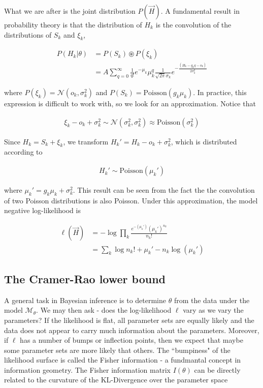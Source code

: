 \documentclass{ucetd}
\begin{document}
What we are after is the joint distribution $P(\vec{H})$. A fundamental result in probability theory is that the distribution of $H_{k}$ is the convolution of the distributions of $S_{k}$ and $\xi_{k}$,

\begin{align}
P(H_{k}|\theta) &= P(S_{k})\circledast P(\xi_{k})\\
&= A\sum_{q=0}^{\infty} \frac{1}{q!}e^{-\mu_{k}}\mu_{k}^{q}\frac{1}{\sqrt{2\pi}\sigma_{k}}e^{-\frac{(H_{k}-g_{k}q-o_{k})}{2\sigma_{k}^{2}}}
\end{align}

where $P(\xi_{k}) = \mathcal{N}(o_{k},\sigma_{k}^{2})$ and $P(S_{k}) = \mathrm{Poisson}(g_{k}\mu_{k})$. In practice, this expression is difficult to work with, so we look for an approximation. Notice that 

\begin{align*}
\xi_{k} - o_{k} + \sigma_{k}^{2} \sim \mathcal{N}(\sigma_{k}^{2},\sigma_{k}^{2}) \approx \mathrm{Poisson}(\sigma_{k}^{2})
\end{align*}

Since $H_{k} = S_{k} + \xi_{k}$, we transform $H_{k}' = H_{k} - o_{k} + \sigma_{k}^{2}$, which is distributed according to 

\begin{align*}
H_{k}' \sim \mathrm{Poisson}(\mu_{k}')
\end{align*}

where $\mu_{k}' = g_{k}\mu_{k} + \sigma_{k}^{2}$. This result can be seen from the fact the the convolution of two Poisson distributions is also Poisson. Under this approximation, the model negative log-likelihood is

\begin{align*}
\ell(\vec{H}) &= -\log \prod_{k} \frac{e^{-\left(\mu_{k}'\right)}\left(\mu_{k}'\right)^{n_{k}}}{n_{k}!}\\
&= \sum_{k}  \log n_{k}! + \mu_{k}' - n_{k}\log\left(\mu_{k}'\right)
\end{align*}


\subsection{The Cramer-Rao lower bound}

A general task in Bayesian inference is to determine $\theta$ from the data under the model $\mathcal{M}_{\theta}$. We may then ask - does the log-likelihood $\ell$ vary as we vary the parameters? If the likelihood is flat, all parameter sets are equally likely and the data does not appear to carry much information about the parameters. Moreover, if $\ell$ has a number of bumps or inflection points, then we expect that maybe some parameter sets are more likely that others. The ``bumpiness" of the likelihood surface is called the Fisher information - a fundmantal concept in information geometry. The Fisher information matrix $I(\theta)$ can be directly related to the curvature of the KL-Divergence over the parameter space
\end{document}
